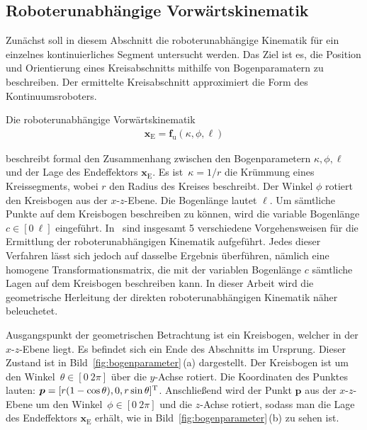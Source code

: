 \subsection{Roboterunabhängige Vorwärtskinematik}
\label{subsec:unabhaengigeVorwaertskinematik}

Zunächst soll in diesem Abschnitt die roboterunabhängige Kinematik für ein einzelnes kontinuierliches Segment untersucht werden. Das Ziel ist es, die Position und Orientierung eines Kreisabschnitts mithilfe von Bogenparamatern zu beschreiben. Der ermittelte Kreisabschnitt approximiert die Form des Kontinuumsroboters. \newline

Die roboterunabhängige Vorwärtskinematik
\begin{align}
\bm{x}_\mathrm{E} = \bm{f}_{\text{u}}(\kappa, \phi, \ell) 
\label{eq:funabhaengig}
\end{align}

beschreibt formal den Zusammenhang zwischen den Bogenparametern $\kappa, \phi, \ell$ und der Lage des Endeffektors $\bm{x}_{\mathrm{E}}.$ 
Es ist~\mbox{$\kappa = 1/r$} die Krümmung eines Kreissegments, wobei $r$ den Radius des Kreises beschreibt. Der Winkel $\phi$ rotiert den Kreisbogen aus der \mbox{$x$-$z$-Ebene}. Die Bogenlänge lautet $\ell$. Um sämtliche Punkte auf dem Kreisbogen beschreiben zu können, wird die variable Bogenlänge \mbox{$c \in [0~\ell]$} eingeführt. In~\cite{WIJ10} sind insgesamt 5 verschiedene Vorgehensweisen für die Ermittlung der roboterunabhängigen Kinematik aufgeführt. Jedes dieser Verfahren lässt sich jedoch auf dasselbe Ergebnis überführen, nämlich eine homogene Transformationsmatrix, die mit der variablen Bogenlänge $c$ sämtliche Lagen auf dem Kreisbogen beschreiben kann. In dieser Arbeit wird die geometrische Herleitung der direkten roboterunabhängigen Kinematik näher beleuchetet. 

Ausgangspunkt der geometrischen Betrachtung ist ein Kreisbogen, welcher in der \mbox{$x$-$z$-Ebene} liegt. Es befindet sich ein Ende des Abschnitts im Ursprung. Dieser Zustand ist in Bild~\ref{fig:bogenparameter}\,(a) dargestellt. Der Kreisbogen ist um den \mbox{Winkel $\theta \in [0~2\pi]$} über die \mbox{$y$-Achse} rotiert. 
Die Koordinaten des Punktes lauten: \mbox{$\bm{p} = [r(1-\cos\theta),0,r\sin\theta]^{\mathrm{T}}$}.
Anschließend wird der Punkt $\bm{p}$ aus der \mbox{$x$-$z$-Ebene} um den \mbox{Winkel~$\phi\in[0~2\pi]$} und die \mbox{$z$-Achse} rotiert, sodass man die Lage des Endeffektors $\bm{x}_{\mathrm{E}}$ erhält, wie in Bild~\ref{fig:bogenparameter}\,(b) zu sehen ist. 

